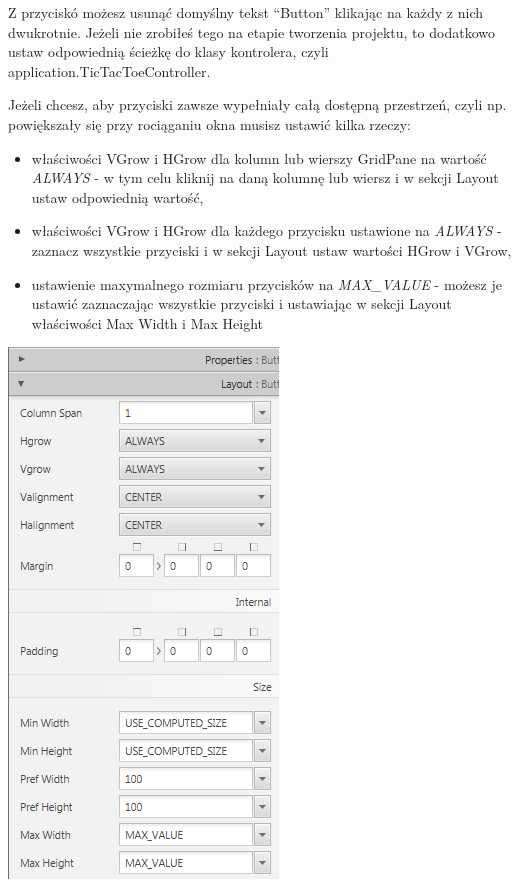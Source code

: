 \documentclass[letterpaper,10pt,english]{sphinxmanual}
\begin{document}
Z przyciskó możesz usunąć domyślny tekst ``Button'' klikając na każdy z nich dwukrotnie. Jeżeli nie zrobiłeś tego na etapie tworzenia projektu, to dodatkowo ustaw odpowiednią ścieżkę do klasy kontrolera, czyli application.TicTacToeController.

Jeżeli chcesz, aby przyciski zawsze wypełniały całą dostępną przestrzeń, czyli np. powiększały się przy rociąganiu okna musisz ustawić kilka rzeczy:
\begin{itemize}
\item {} 
właściwości VGrow i HGrow dla kolumn lub wierszy GridPane na wartość \emph{ALWAYS} - w tym celu kliknij na daną kolumnę lub wiersz i w sekcji Layout ustaw odpowiednią wartość,

\item {} 
właściwości VGrow i HGrow dla każdego przycisku ustawione na \emph{ALWAYS} - zaznacz wszystkie przyciski i w sekcji Layout ustaw wartości HGrow i VGrow,

\item {} 
ustawienie maxymalnego rozmiaru przycisków na \emph{MAX\_VALUE} - możesz je ustawić zaznaczając wszystkie przyciski i ustawiając w sekcji Layout właściwości Max Width i Max Height

\end{itemize}

{\hfill\includegraphics{but_lay.png}\hfill}
\end{document}
